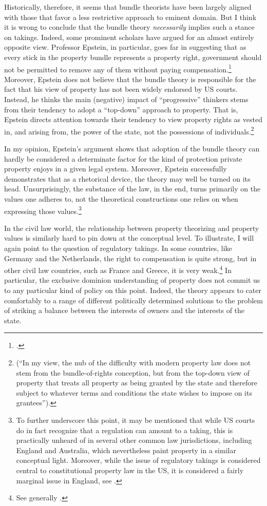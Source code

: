 Historically, therefore, it seems that bundle theorists have been largely aligned with those that favor a less restrictive approach to eminent domain. But I think it is wrong to conclude that the bundle theory {\it necessarily} implies such a stance on takings. Indeed, some prominent scholars have argued for an almost entirely opposite view. Professor Epstein, in particular, goes far in suggesting that as every stick in the property bundle represents a property right, government should not be permitted to remove any of them without paying compensation.\footcite[232-233]{epstein11} Moreover, Epstein does not believe that the bundle theory is responsible for the fact that his view of property has not been widely endorsed by US courts. Instead, he thinks the main (negative) impact of ``progressive'' thinkers stems from their tendency to adopt a ``top-down'' approach to property. That is, Epstein directs attention towards their tendency to view property rights as vested in, and arising from, the power of the state, not the possessions of individuals.\footnote{\cite[227-228]{epstein11} (``In my view, the nub of the difficulty with modern property law does not stem from the bundle-of-rights conception, but from the top-down view of property that treats all property as being granted by the state and therefore subject to whatever terms and conditions the state wishes to impose on its grantees'').} 

In my opinion, Epstein's argument shows that adoption of the bundle theory can hardly be considered a determinate factor for the kind of protection private property enjoys in a given legal system. Moreover, Epstein successfully demonstrates that as a rhetorical device, the theory may well be turned on its head. Unsurprisingly, the substance of the law, in the end, turns primarily on the values one adheres to, not the theoretical constructions one relies on when expressing those values.\footnote{To further underscore this point, it may be mentioned that while US courts do in fact recognize that a regulation can amount to a taking, this is practically unheard of in several other common law jurisdictions, including England and Australia, which nevertheless paint property in a similar conceptual light. Moreover, while the issue of regulatory takings is considered central to constitutional property law in the US, it is considered a fairly marginal issue in England, see \cite{purdue10}.}

In the civil law world, the relationship between property theorizing and property values is similarly hard to pin down at the conceptual level. To illustrate, I will again point to the question of regulatory takings. In some countries, like Germany and the Netherlands, the right to compensation is quite strong, but in other civil law countries, such as France and Greece, it is very weak.\footnote{See generally \cite{alterman10}.} In particular, the exclusive dominion understanding of property does not commit us to any particular kind of policy on this point. Indeed, the theory appears to cater comfortably to a range of different politically determined solutions to the problem of striking a balance between the interests of owners and the interests of the state. 

